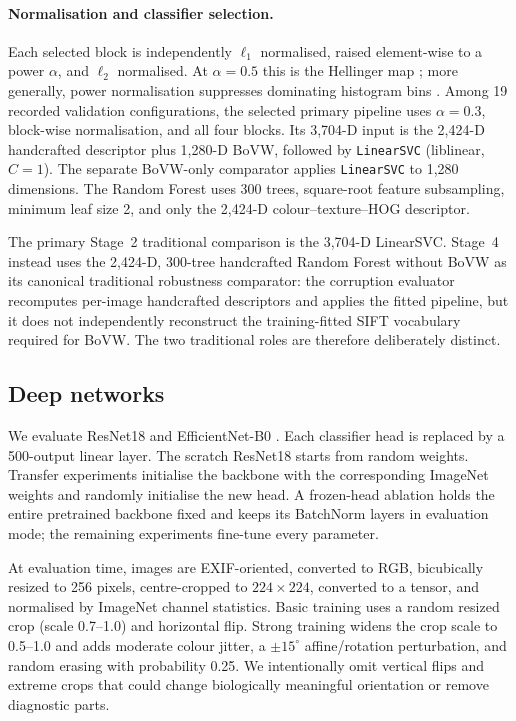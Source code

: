 \paragraph{Normalisation and classifier selection.}
Each selected block is independently $\ell_1$ normalised, raised element-wise
to a power $\alpha$, and $\ell_2$ normalised.  At $\alpha{=}0.5$ this is the
Hellinger map \cite{arandjelovic2012three}; more generally, power
normalisation suppresses dominating histogram bins
\cite{perronnin2010improving}.  Among 19 recorded validation configurations,
the selected primary pipeline uses $\alpha{=}0.3$, block-wise normalisation,
and all four blocks.  Its 3,704-D input is the 2,424-D handcrafted descriptor
plus 1,280-D BoVW, followed by \texttt{LinearSVC} (liblinear, $C{=}1$).  The
separate BoVW-only comparator applies \texttt{LinearSVC} to 1,280 dimensions.
The Random Forest uses 300 trees, square-root feature subsampling, minimum leaf
size 2, and only the 2,424-D colour--texture--HOG descriptor.

The primary Stage~2 traditional comparison is the 3,704-D LinearSVC.  Stage~4
instead uses the 2,424-D, 300-tree handcrafted Random Forest without BoVW as
its canonical traditional robustness comparator: the corruption evaluator
recomputes per-image handcrafted descriptors and applies the fitted pipeline,
but it does not independently reconstruct the training-fitted SIFT vocabulary
required for BoVW.  The two traditional roles are therefore deliberately
distinct.

\subsection{Deep networks}

We evaluate ResNet18 \cite{he2016deep} and EfficientNet-B0
\cite{tan2019efficientnet}.  Each classifier head is replaced by a 500-output
linear layer.  The scratch ResNet18 starts from random weights.  Transfer
experiments initialise the backbone with the corresponding ImageNet weights
and randomly initialise the new head.  A frozen-head ablation holds the entire
pretrained backbone fixed and keeps its BatchNorm layers in evaluation mode;
the remaining experiments fine-tune every parameter.

At evaluation time, images are EXIF-oriented, converted to RGB, bicubically
resized to 256 pixels, centre-cropped to $224\!\times\!224$, converted to a
tensor, and normalised by ImageNet channel statistics.  Basic training uses a
random resized crop (scale 0.7--1.0) and horizontal flip.  Strong training
widens the crop scale to 0.5--1.0 and adds moderate colour jitter, a
$\pm15^{\circ}$ affine/rotation perturbation, and random erasing with
probability 0.25.  We intentionally omit vertical flips and extreme crops that
could change biologically meaningful orientation or remove diagnostic parts.

